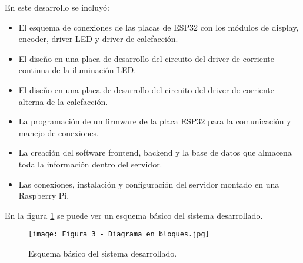 En este desarrollo se incluyó:
\begin{itemize}
	\item El esquema de conexiones de las placas de ESP32 con los módulos de display, encoder, driver LED y driver de calefacción.
	\item El diseño en una placa de desarrollo del circuito del driver de corriente continua de la iluminación LED.
	\item El diseño en una placa de desarrollo del circuito del driver de corriente alterna de la calefacción.
	\item La programación de un firmware de la placa ESP32 para la comunicación y manejo de conexiones.
	\item La creación del software frontend, backend y la base de datos que almacena toda la información dentro del servidor.
	\item Las conexiones, instalación y configuración del servidor montado en una Raspberry Pi.
\end{itemize}

En la figura \ref{fig:4} se puede ver un esquema básico del sistema desarrollado.
\begin{figure}[h]
\centering
\texttt{[image: Figura 3 - Diagrama en bloques.jpg]}
\caption[Esquema básico]{Esquema básico del sistema desarrollado. \protect}
\label{fig:4}
\end{figure}
